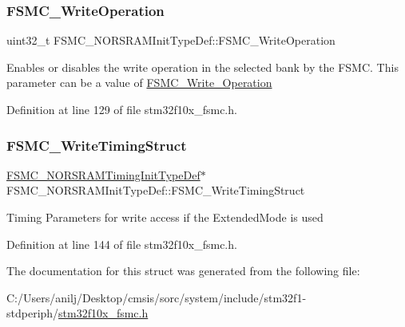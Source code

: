 \mbox{\label{struct_f_s_m_c___n_o_r_s_r_a_m_init_type_def_a596793d1735c4e38c87e3bf91d986370}} 
\subsubsection{\texorpdfstring{F\+S\+M\+C\+\_\+\+Write\+Operation}{FSMC\_WriteOperation}}
{\footnotesize\ttfamily uint32\+\_\+t F\+S\+M\+C\+\_\+\+N\+O\+R\+S\+R\+A\+M\+Init\+Type\+Def\+::\+F\+S\+M\+C\+\_\+\+Write\+Operation}

Enables or disables the write operation in the selected bank by the F\+S\+MC. This parameter can be a value of \hyperlink{group___f_s_m_c___write___operation}{F\+S\+M\+C\+\_\+\+Write\+\_\+\+Operation} 

Definition at line 129 of file stm32f10x\+\_\+fsmc.\+h.

\mbox{\label{struct_f_s_m_c___n_o_r_s_r_a_m_init_type_def_ac62cf7426a933ce6aa6efc3a8e82dac1}} 
\subsubsection{\texorpdfstring{F\+S\+M\+C\+\_\+\+Write\+Timing\+Struct}{FSMC\_WriteTimingStruct}}
{\footnotesize\ttfamily \hyperlink{struct_f_s_m_c___n_o_r_s_r_a_m_timing_init_type_def}{F\+S\+M\+C\+\_\+\+N\+O\+R\+S\+R\+A\+M\+Timing\+Init\+Type\+Def}$\ast$ F\+S\+M\+C\+\_\+\+N\+O\+R\+S\+R\+A\+M\+Init\+Type\+Def\+::\+F\+S\+M\+C\+\_\+\+Write\+Timing\+Struct}

Timing Parameters for write access if the Extended\+Mode is used 

Definition at line 144 of file stm32f10x\+\_\+fsmc.\+h.



The documentation for this struct was generated from the following file\+:\begin{DoxyCompactItemize}
\item 
C\+:/\+Users/anilj/\+Desktop/cmsis/sorc/system/include/stm32f1-\/stdperiph/\hyperlink{stm32f10x__fsmc_8h}{stm32f10x\+\_\+fsmc.\+h}\end{DoxyCompactItemize}
